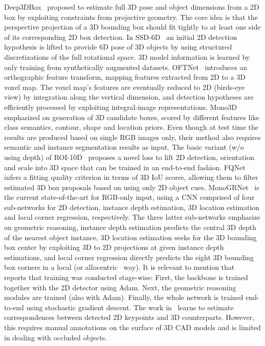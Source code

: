 \documentclass[10pt,twocolumn,letterpaper]{article}
\begin{document}
Deep3DBox~\cite{Mousavian_2017_CVPR} proposed to estimate full 3D pose and object dimensions from a 2D box by exploiting constraints from projective geometry. The core idea is that the perspective projection of a 3D bounding box should fit tightly to at least one side of its corresponding 2D box detection. In SSD-6D~\cite{Kehl_2017_ICCV} an initial 2D detection hypothesis is lifted to provide 6D pose of 3D objects by using structured discretizations of the full rotational space. 3D model information is learned by only training from synthetically augmented datasets. OFTNet~\cite{Roddick18} introduces an orthographic feature transform, mapping features extracted from 2D to a 3D voxel map. The voxel map's features are eventually reduced to 2D (birds-eye view) by integration along the vertical dimension, and detection hypotheses are efficiently processed by exploiting integral-image representations. Mono3D~\cite{Chen_2016_CVPR} emphasized on generation of 3D candidate boxes, scored by different features like class semantics, contour, shape and location priors. Even though at test time the results are produced based on single RGB images only, their method also requires semantic and instance segmentation results as input. The basic variant (w/o using depth) of ROI-10D~\cite{Manhardt_2019_CVPR} proposes a novel loss to lift 2D detection, orientation and scale into 3D space that can be trained in an end-to-end fashion. FQNet~\cite{Liu+19} infers a fitting quality criterion in terms of 3D IoU scores, allowing them to filter estimated 3D box proposals based on using only 2D object cues. MonoGRNet~\cite{qin2019monogrnet} is the current state-of-the-art for RGB-only input, using a CNN comprised of four sub-networks for 2D detection, instance depth estimation, 3D location estimation and local corner regression, respectively. The three latter sub-networks emphasize on geometric reasoning, \ie instance depth estimation predicts the central 3D depth of the nearest object instance, 3D location estimation seeks for the 3D bounding box center by exploiting 3D to 2D projections at given instance depth estimations, and local corner regression directly predicts the eight 3D bounding box corners in a local (or allocentric~\cite{Kundu_2018_CVPR,Manhardt_2019_CVPR} way). It is relevant to mention that~\cite{qin2019monogrnet} reports that training was conducted stage-wise: First, the backbone is trained together with the 2D detector using Adam. Next, the geometric reasoning modules are trained (also with Adam). Finally, the whole network is trained end-to-end using stochastic gradient descent. The work in~\cite{Barabanau_arXiv_2019} learns to estimate correspondences between detected 2D keypoints and 3D counterparts. However, this requires manual annotations on the surface of 3D CAD models and is limited in dealing with occluded objects.
\end{document}
